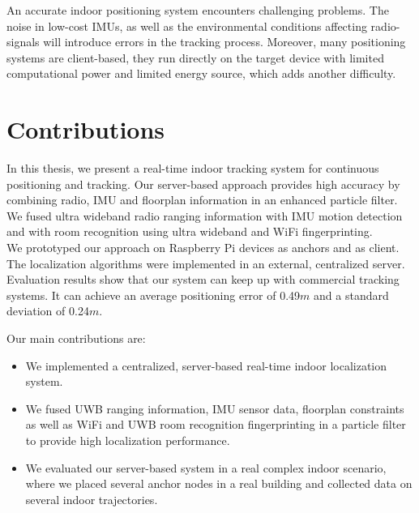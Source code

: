 \noindent\hspace*{5mm}%
An accurate indoor positioning system encounters challenging problems. The noise in low-cost IMUs, as well as the environmental conditions affecting radio-signals will introduce errors in the tracking process. Moreover, many positioning systems are client-based, they run directly on the target device with limited computational power and limited energy source, which adds another difficulty.



\section{Contributions}

In this thesis, we present a real-time indoor tracking system for continuous positioning and tracking. Our server-based approach provides high accuracy by combining radio, IMU and floorplan information in an enhanced particle filter. We fused ultra wideband radio ranging information with IMU motion detection and with room recognition using ultra wideband and WiFi fingerprinting. \\
\noindent\hspace*{5mm}%
We prototyped our approach on Raspberry Pi devices as anchors and as client. The localization algorithms were implemented in an external, centralized server.
Evaluation results show that our system can keep up with commercial tracking systems. It can achieve an average positioning error of 0.49$m$ and a standard deviation of 0.24$m$.

Our main contributions are:
\begin{itemize}
\item We implemented a centralized, server-based real-time indoor localization system.
\item We fused UWB ranging information, IMU sensor data, floorplan constraints as well as WiFi and UWB room recognition fingerprinting in a particle filter to provide high localization performance. 
\item We evaluated our server-based system in a real complex indoor scenario, where we placed several anchor nodes in a real building and collected data on several indoor trajectories. 
\end{itemize}



